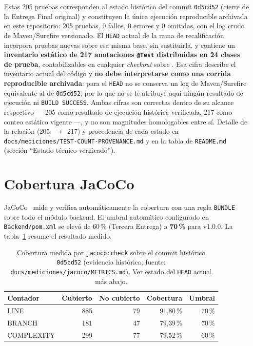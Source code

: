 Estas 205 pruebas corresponden al estado hist\'orico del commit
\texttt{0d5cd52} (cierre de la Entrega Final original) y constituyen la
\'unica ejecuci\'on reproducible archivada en este repositorio: 205
pruebas, 0 fallos, 0 errores y 0 omitidas, con el log crudo de
Maven/Surefire versionado. El \texttt{HEAD} actual de la rama de
recalificaci\'on incorpora pruebas nuevas sobre esa misma base, sin
sustituirla, y contiene un \textbf{inventario est\'atico de 217 anotaciones
\texttt{@Test} distribuidas en 24 clases de prueba},
contabilizables en cualquier \emph{checkout} sobre
. Esa cifra describe el
inventario actual del c\'odigo y \textbf{no debe interpretarse como una
corrida reproducible archivada}: para el \texttt{HEAD} no se conserva un
log de Maven/Surefire equivalente al de \texttt{0d5cd52}, por lo que no
se le atribuye aqu\'i ning\'un resultado de ejecuci\'on ni
\texttt{BUILD SUCCESS}. Ambas cifras son correctas dentro de su alcance
respectivo --- 205 como resultado de ejecuci\'on hist\'orica verificada,
217 como conteo est\'atico vigente ---, y no son magnitudes
homologables entre s\'i. Detalle de la relaci\'on
(205~$\rightarrow$~217) y procedencia de cada estado en
\texttt{docs/mediciones/TEST-COUNT-PROVENANCE.md} y en la tabla de
\texttt{README.md} (secci\'on ``Estado t\'ecnico verificado'').

\section{Cobertura JaCoCo}
\label{sec:jacoco-final}

JaCoCo~\cite{jacoco-docs} mide y verifica autom\'aticamente la cobertura
con una regla \texttt{BUNDLE} sobre todo el m\'odulo backend. El umbral
autom\'atico configurado en \texttt{Backend/pom.xml} se elev\'o de 60\,\%
(Tercera Entrega) a \textbf{70\,\%} para v1.0.0. La
tabla~\ref{tab:jacoco-final} resume el resultado medido.

\begin{table}[H]
  \centering
  \caption{Cobertura medida por \texttt{jacoco:check} sobre el commit hist\'orico \texttt{0d5cd52} (evidencia hist\'orica; fuente: \texttt{docs/mediciones/jacoco/METRICS.md}). Ver estado del \texttt{HEAD} actual m\'as abajo.}
  \label{tab:jacoco-final}
  \begin{tabular}{@{}lrrrr@{}}
    \toprule
    Contador & Cubierto & No cubierto & Cobertura & Umbral \\
    \midrule
    LINE & 885 & 79 & 91{,}80\,\% & 70\,\% \\
    BRANCH & 181 & 47 & 79{,}39\,\% & 70\,\% \\
    COMPLEXITY & 299 & 77 & 79{,}52\,\% & 60\,\% \\
    \bottomrule
  \end{tabular}
\end{table}

